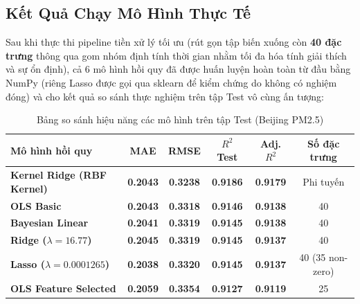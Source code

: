 \documentclass[12pt,a4paper]{article}
\begin{document}
\subsection{Kết Quả Chạy Mô Hình Thực Tế}
Sau khi thực thi pipeline tiền xử lý tối ưu (rút gọn tập biến xuống còn \textbf{40 đặc trưng} thông qua gom nhóm định tính thời gian nhằm tối đa hóa tính giải thích và sự ổn định), cả 6 mô hình hồi quy đã được huấn luyện hoàn toàn từ đầu bằng NumPy (riêng Lasso được gọi qua sklearn để kiểm chứng do không có nghiệm đóng) và cho kết quả so sánh thực nghiệm trên tập Test vô cùng ấn tượng:

\begin{table}[H]
\centering
\caption{Bảng so sánh hiệu năng các mô hình trên tập Test (Beijing PM2.5)}
\begin{tabular}{lccccc}
\toprule
\textbf{Mô hình hồi quy} & \textbf{MAE} & \textbf{RMSE} & \textbf{$R^2$ Test} & \textbf{Adj. $R^2$} & \textbf{Số đặc trưng} \\
\midrule
\textbf{Kernel Ridge (RBF Kernel)} & \textbf{0.2043} & \textbf{0.3238} & \textbf{0.9186} & \textbf{0.9179} & Phi tuyến \\
\textbf{OLS Basic} & \textbf{0.2043} & \textbf{0.3318} & \textbf{0.9146} & \textbf{0.9138} & 40 \\
\textbf{Bayesian Linear} & \textbf{0.2041} & \textbf{0.3319} & \textbf{0.9145} & \textbf{0.9138} & 40 \\
\textbf{Ridge ($\lambda = 16.77$)} & \textbf{0.2045} & \textbf{0.3319} & \textbf{0.9145} & \textbf{0.9137} & 40 \\
\textbf{Lasso ($\lambda = 0.0001265$)} & \textbf{0.2038} & \textbf{0.3320} & \textbf{0.9145} & \textbf{0.9137} & 40 (35 non-zero) \\
\textbf{OLS Feature Selected} & \textbf{0.2059} & \textbf{0.3354} & \textbf{0.9127} & \textbf{0.9119} & 25 \\
\bottomrule
\end{tabular}
\end{table}
\end{document}
